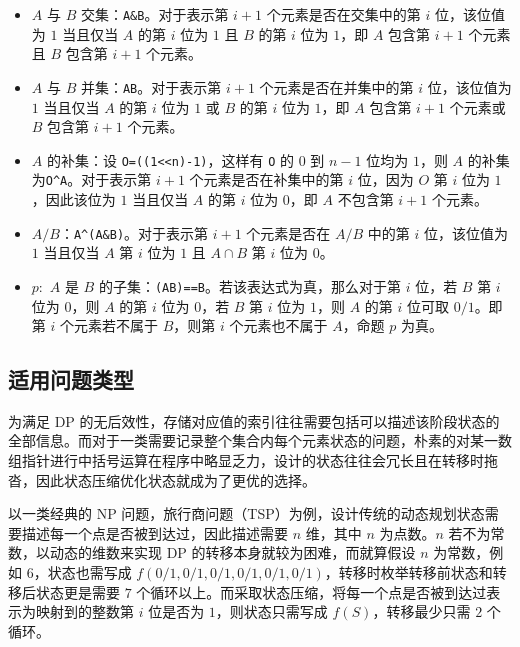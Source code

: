 \begin{itemize}
\tightlist
\item
  \(A\) 与 \(B\) 交集：\texttt{A\&B}。对于表示第 \(i+1\)
  个元素是否在交集中的第 \(i\) 位，该位值为 \(1\) 当且仅当 \(A\) 的第
  \(i\) 位为 \(1\) 且 \(B\) 的第 \(i\) 位为 \(1\)，即 \(A\) 包含第
  \(i+1\) 个元素且 \(B\) 包含第 \(i+1\) 个元素。
\item
  \(A\) 与 \(B\) 并集：\texttt{A\textbar{}B}。对于表示第 \(i+1\)
  个元素是否在并集中的第 \(i\) 位，该位值为 \(1\) 当且仅当 \(A\) 的第
  \(i\) 位为 \(1\) 或 \(B\) 的第 \(i\) 位为 \(1\)，即 \(A\) 包含第
  \(i+1\) 个元素或 \(B\) 包含第 \(i+1\) 个元素。
\item
  \(A\) 的补集：设 \texttt{O=((1\textless{}\textless{}n)-1)}，这样有
  \texttt{O} 的 \(0\) 到 \(n-1\) 位均为 \(1\)，则 \(A\)
  的补集为\texttt{O\^{}A}。对于表示第 \(i+1\) 个元素是否在补集中的第
  \(i\) 位，因为 \(O\) 第 \(i\) 位为 \(1\)，因此该位为 \(1\) 当且仅当
  \(A\) 的第 \(i\) 位为 \(0\)，即 \(A\) 不包含第 \(i+1\) 个元素。
\item
  \(A/B\)：\texttt{A\^{}(A\&B)}。对于表示第 \(i+1\) 个元素是否在 \(A/B\)
  中的第 \(i\) 位，该位值为 \(1\) 当且仅当 \(A\) 第 \(i\) 位为 \(1\) 且
  \(A\cap B\) 第 \(i\) 位为 \(0\)。
\item
  \(p:\) \(A\) 是 \(B\)
  的子集：\texttt{(A\textbar{}B)==B}。若该表达式为真，那么对于第 \(i\)
  位，若 \(B\) 第 \(i\) 位为 \(0\)，则 \(A\) 的第 \(i\) 位为 \(0\)，若
  \(B\) 第 \(i\) 位为 \(1\)，则 \(A\) 的第 \(i\) 位可取 \(0/1\)。即第
  \(i\) 个元素若不属于 \(B\)，则第 \(i\) 个元素也不属于 \(A\)，命题
  \(p\) 为真。
\end{itemize}

\subsection{适用问题类型}

为满足 DP
的无后效性，存储对应值的索引往往需要包括可以描述该阶段状态的全部信息。而对于一类需要记录整个集合内每个元素状态的问题，朴素的对某一数组指针进行中括号运算在程序中略显乏力，设计的状态往往会冗长且在转移时拖沓，因此状态压缩优化状态就成为了更优的选择。

以一类经典的 NP
问题，旅行商问题（TSP）为例，设计传统的动态规划状态需要描述每一个点是否被到达过，因此描述需要
\(n\) 维，其中 \(n\) 为点数。\(n\) 若不为常数，以动态的维数来实现 DP
的转移本身就较为困难，而就算假设 \(n\) 为常数，例如 \(6\)，状态也需写成
\(f(0/1,0/1,0/1,0/1,0/1,0/1)\)，转移时枚举转移前状态和转移后状态更是需要
\(7\)
个循环以上。而采取状态压缩，将每一个点是否被到达过表示为映射到的整数第
\(i\) 位是否为 \(1\)，则状态只需写成 \(f(S)\)，转移最少只需 \(2\)
个循环。

